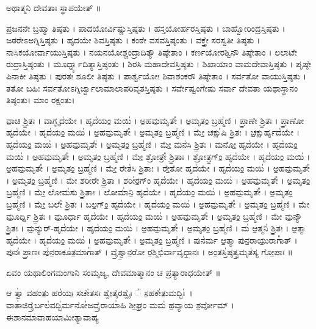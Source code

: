 ಅಥಾತ್ಮನಿ ದೇವತಾಃ ಸ್ಥಾಪಯೇತ್ ॥

ಪ್ರಜನನೇ ಬ್ರಹ್ಮಾ ತಿಷ್ಠತು । ಪಾದಯೋರ್ವಿಷ್ಣುಸ್ತಿಷ್ಠತು । ಹಸ್ತಯೋರ್ಹರಸ್ತಿಷ್ಠತು । ಬಾಹ್ವೋರಿಂದ್ರಸ್ತಿಷ್ಠತು । ಜಠರೇಽಅಗ್ನಿಸ್ತಿಷ್ಠತು । ಹೃದಯೇ ಶಿವಸ್ತಿಷ್ಠತು । ಕಂಠೇ ವಸವಸ್ತಿಷ್ಠಂತು । ವಕ್ತ್ರೇ ಸರಸ್ವತೀ ತಿಷ್ಠತು । ನಾಸಿಕಯೋರ್ವಾಯುಸ್ತಿಷ್ಠತು । ನಯನಯೋಶ್ಚಂದ್ರಾದಿತ್ಯೌ ತಿಷ್ಠೇತಾಂ । ಕರ್ಣಯೋರಶ್ವಿನೌ ತಿಷ್ಠೇತಾಂ । ಲಲಾಟೇ ರುದ್ರಾಸ್ತಿಷ್ಠಂತು । ಮೂರ್ಧ್ನ್ಯಾದಿತ್ಯಾಸ್ತಿಷ್ಠಂತು । ಶಿರಸಿ ಮಹಾದೇವಸ್ತಿಷ್ಠತು । ಶಿಖಾಯಾಂ ವಾಮದೇವಾಸ್ತಿಷ್ಠತು । ಪೃಷ್ಠೇ ಪಿನಾಕೀ ತಿಷ್ಠತು । ಪುರತಃ ಶೂಲೀ ತಿಷ್ಠತು । ಪಾರ್ಶ್ವಯೋಃ ಶಿವಾಶಂಕರೌ ತಿಷ್ಠೇತಾಂ । ಸರ್ವತೋ ವಾಯುಸ್ತಿಷ್ಠತು । ತತೋ ಬಹಿಃ ಸರ್ವತೋಽಗ್ನಿರ್ಜ್ವಾಲಾಮಾಲಾಪರಿವೃತಸ್ತಿಷ್ಠತು । ಸರ್ವೇಷ್ವಂಗೇಷು ಸರ್ವಾ ದೇವತಾ ಯಥಾಸ್ಥಾನಂ ತಿಷ್ಠಂತು। ಮಾಂ ರಕ್ಷಂತು।

 ವಾ॒ಚಿ ಶ್ರಿ॒ತಃ । ವಾಗ್ಘೃದ॑ಯೇ । ಹೃದ॑ಯಂ॒ ಮಯಿ॑ । ಅ॒ಹಮ॒ಮೃತೇ᳚ । ಅ॒ಮೃತಂ॒ ಬ್ರಹ್ಮ॑ಣಿ ।  ಪ್ರಾ॒ಣೇ ಶ್ರಿ॒ತಃ । ಪ್ರಾ॒ಣೋ ಹೃದ॑ಯೇ । ಹೃದ॑ಯಂ॒ ಮಯಿ॑ । ಅ॒ಹಮ॒ಮೃತೇ᳚ । ಅ॒ಮೃತಂ॒ ಬ್ರಹ್ಮ॑ಣಿ ।  ಮೇ॒ ಚಕ್ಷು॑ಷಿ ಶ್ರಿ॒ತಃ । ಚ॒ಕ್ಷುರ್ಹೃದ॑ಯೇ । ಹೃದ॑ಯಂ॒ ಮಯಿ॑ । ಅ॒ಹಮ॒ಮೃತೇ᳚ । ಅ॒ಮೃತಂ॒ ಬ್ರಹ್ಮ॑ಣಿ ।  ಮೇ॒ ಮನ॑ಸಿ ಶ್ರಿ॒ತಃ । ಮನೋ॒ ಹೃದ॑ಯೇ । ಹೃದ॑ಯಂ॒ ಮಯಿ॑ । ಅ॒ಹಮ॒ಮೃತೇ᳚ । ಅ॒ಮೃತಂ॒ ಬ್ರಹ್ಮ॑ಣಿ ।  ಮೇ॒ ಶ್ರೋತ್ರೇ᳚ ಶ್ರಿ॒ತಾಃ । ಶ್ರೋತ್ರ॒ಗ್ಂ॒ ಹೃದ॑ಯೇ । ಹೃದ॑ಯಂ॒ ಮಯಿ॑ । ಅ॒ಹಮ॒ಮೃತೇ᳚ । ಅ॒ಮೃತಂ॒ ಬ್ರಹ್ಮ॑ಣಿ ।  ಮೇ॒ ರೇತ॑ಸಿ ಶ್ರಿ॒ತಾಃ । ರೇ॒ತೋ ಹೃದ॑ಯೇ । ಹೃದ॑ಯಂ॒ ಮಯಿ॑ । ಅ॒ಹಮ॒ಮೃತೇ᳚ । ಅ॒ಮೃತಂ॒ ಬ್ರಹ್ಮ॑ಣಿ ।  ಮೇ ಶರೀ॑ರೇ ಶ್ರಿ॒ತಾ । ಶರೀ॑ರ॒ಗ್ಂ ಹೃದ॑ಯೇ । ಹೃದ॑ಯಂ॒ ಮಯಿ॑ । ಅ॒ಹಮ॒ಮೃತೇ᳚ । ಅ॒ಮೃತಂ॒ ಬ್ರಹ್ಮ॑ಣಿ ।  ಮೇ॒ ಲೋಮ॑ಸು ಶ್ರಿ॒ತಾಃ । ಲೋಮಾ॑ನಿ॒ ಹೃದ॑ಯೇ । ಹೃದ॑ಯಂ॒ ಮಯಿ॑ । ಅ॒ಹಮ॒ಮೃತೇ᳚ । ಅ॒ಮೃತಂ॒ ಬ್ರಹ್ಮ॑ಣಿ ।  ಮೇ॒ ಬಲೇ᳚ ಶ್ರಿ॒ತಃ । ಬಲ॒ಗ್ಂ॒ ಹೃದ॑ಯೇ । ಹೃದ॑ಯಂ॒ ಮಯಿ॑ । ಅ॒ಹಮ॒ಮೃತೇ᳚ । ಅ॒ಮೃತಂ॒ ಬ್ರಹ್ಮ॑ಣಿ ।  ಮೇ ಮೂ॒ರ್ಧ್ನಿ ಶ್ರಿ॒ತಃ । ಮೂ॒ರ್ಧಾ ಹೃದ॑ಯೇ । ಹೃದ॑ಯಂ॒ ಮಯಿ॑ । ಅ॒ಹಮ॒ಮೃತೇ᳚ । ಅ॒ಮೃತಂ॒ ಬ್ರಹ್ಮ॑ಣಿ ।  ಮೇ ಮ॒ನ್ಯೌ ಶ್ರಿ॒ತಃ । ಮ॒ನ್ಯುರ್-ಹೃದ॑ಯೇ । ಹೃದ॑ಯಂ॒ ಮಯಿ॑ । ಅ॒ಹಮ॒ಮೃತೇ᳚ । ಅ॒ಮೃತಂ॒ ಬ್ರಹ್ಮ॑ಣಿ ।  ಮ॑ ಆ॒ತ್ಮನಿ॑ ಶ್ರಿ॒ತಃ । ಆ॒ತ್ಮಾ ಹೃದ॑ಯೇ । ಹೃದ॑ಯಂ॒ ಮಯಿ॑ । ಅ॒ಹಮ॒ಮೃತೇ᳚ । ಅ॒ಮೃತಂ॒ ಬ್ರಹ್ಮ॑ಣಿ । ಪುನ॑ರ್ಮ ಆ॒ತ್ಮಾ ಪುನ॒ರಾಯು॒ರಾಗಾ᳚ತ್ । ಪುನಃ॑ ಪ್ರಾ॒ಣಃ ಪು॑ನ॒ರಾಕೂ॑ತ॒ಮಾಗಾ᳚ತ್ । ವೈ॒ಶ್ವಾ॒ನ॒ರೋ ರ॒ಶ್ಮಿಭಿ॑ರ್ವಾವೃಧಾ॒ನಃ । ಅಂ॒ತಸ್ತಿ॑ಷ್ಠತ್ವ॒ಮೃತ॑ಸ್ಯ ಗೋ॒ಪಾಃ ॥

ಏವಂ ಯಥಾಲಿಂಗಮಂಗಾನಿ ಸಂಮೃಜ್ಯ, ದೇವಮಾತ್ಮಾನಂ ಚ ಪ್ರತ್ಯಾರಾಧಯೇತ್ ॥\\

ಆ ತ್ವಾ॑ ವಹಂತು॒ ಹರ॑ಯಃ॒ ಸಚೇ॑ತಸಃ ಶ್ವೇ॒ತೈರಶ್ವೈಃ ᳚  ಸ॒ಹಕೇ॑ತು॒ಮದ್ಭಿಃ॑~। ವಾತಾ॑ಜಿರೈ॒ರ್ಬಲ॑ವದ್ಭಿ॑ರ್ಮನೋ॑ಜವೈ॒ರಾಯಾ॑ಹಿ ಶೀ॒ಘ್ರಂ ಮಮ॑ ಹ॒ವ್ಯಾಯ ಶ॒ರ್ವೋಮ್ । ಈಶಾನಮಾವಾಹಯಾಮೀತ್ಯಾವಾಹ್ಯ\\
